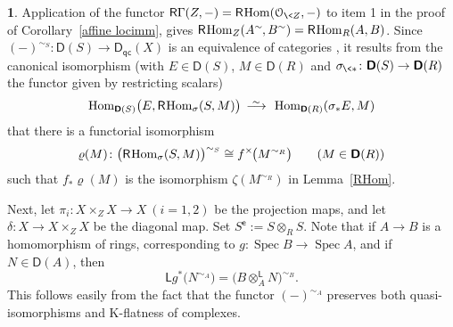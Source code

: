 \documentclass{compositio}
\theoremstyle{plain}
\theoremstyle{definition}
\newtheorem{cosa}[thm]{}
\theoremstyle{remark}
\numberwithin{equation}{thm}
\begin{document}
\begin{cosa}
Application of the functor  ${\mathsf R}\Gamma(Z,-)={\mathsf R}{\mkern-1mu}{\mkern-1mu}\operatorname{Hom}({\mathcal O_{\<Z}},-)$ to item 1 in the proof of  Corollary~\ref{affine locimm}, 
gives ${\mathsf R}{\mkern-1mu}{\mkern-1mu}\operatorname{Hom}_Z(A^\sim{\mkern-1mu},B^\sim)={\mathsf R}{\mkern-1mu}{\mkern-1mu}\operatorname{Hom}_R(A,B)$. Since $(-)^{\sim_S}\colon{\boldsymbol{\mathsf{D}}}(S)\to{{\boldsymbol{\mathsf{D}}}_{\mathsf{qc}}}(X)$ is an equivalence of categories \cite[p.\,230, 5.5]{BN},  it results from the canonical isomorphism (with $E\in{\boldsymbol{\mathsf{D}}}(S)$,
$M\in{\boldsymbol{\mathsf{D}}}(R)$ and $\sigma_{{\mkern-1mu}\<*}\colon{\boldsymbol{\mathsf{D}}}(S)\to{\boldsymbol{\mathsf{D}}}(R)$ the functor given by restricting scalars)
\[
\operatorname{Hom}_{{\boldsymbol{\mathsf{D}}}(S)}\!\big(E, {\mathsf R}{\mkern-1mu}{\mkern-1mu}\operatorname{Hom}_\sigma(S,M)\big){{\mkern8mu\longrightarrow \mkern-25.5mu{}^\sim\mkern17mu}}
\operatorname{Hom}_{{\boldsymbol{\mathsf{D}}}(R)}(\sigma_*E,M)
\] 
that there is a functorial isomorphism
\begin{equation}\label{aff times}
\varrho(M)\colon \big({\mathsf R}{\mkern-1mu}{\mkern-1mu}\operatorname{Hom}_\sigma(S,M)\big)^{\sim_S} \cong f^\times{\mkern-1mu}{\mkern-1mu} \big(M^{\sim_R}\big)
\qquad(M\in{\boldsymbol{\mathsf{D}}}(R)) 
\end{equation}
such that $f_*\varrho(M)$ is the isomorphism $\zeta(M^{\sim_R})$ in Lemma~\ref{RHom}.{\vspace{1pt}}
 
Next, let $\pi_i\colon X\times_Z X\to X\ (i=1,2)$ be the projection maps, and let 
\mbox{$\delta\colon X\to X\times_Z X$} 
be the diagonal map.   Set ${{S}^{\mathsf e}}{\!:=} S\otimes_R S$. Note that if $A\to B$ is a homomorphism of rings,  corresponding to
$g\colon\operatorname{Spec} B\to\operatorname{Spec} A$, and if $N\in{\boldsymbol{\mathsf{D}}}(A)$, then
\begin{equation}\label{aff^*}
{\mathsf L} g^*\big(N^{\sim_A}) =\big(B{\otimes^{\mathsf L}_{{A}}} N\big)^{\sim_B}.
\end{equation}
This follows easily from the fact that the functor $(-)^{\sim_A}$ preserves both quasi-isomorphisms 
and K-flatness of complexes.


\end{cosa}
\end{document}
